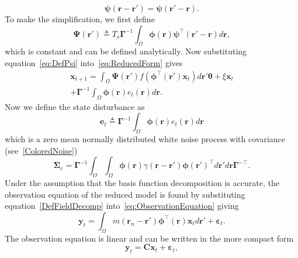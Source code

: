 \documentclass[10pt,a4paper]{article}
\begin{document}
\begin{equation}
	\boldsymbol{\psi} (\mathbf{r}-\mathbf{r}') = \boldsymbol{\psi} (\mathbf{r}'-\mathbf{r}).
\end{equation}
To make the simplification, we first define
\begin{equation}\label{eq:DefPsi}
	\boldsymbol{\Psi}(\mathbf{r}') \triangleq T_s\boldsymbol{\Gamma}^{-1}\int_\Omega {\boldsymbol{\phi}(\mathbf{r})\boldsymbol{\psi}^{\top} (\mathbf{r}'-\mathbf{r})d\mathbf{r}},
\end{equation}
which is constant and can be defined analytically. Now substituting equation~\ref{eq:DefPsi} into~\ref{eq:ReducedForm} gives
\begin{eqnarray}
	\mathbf{x}_{t+1} = \int_\Omega \boldsymbol{\Psi}(\mathbf{r}') f(\boldsymbol{\phi}^{\top}(\mathbf{r}')\mathbf{x}_t) d\mathbf{r}' \boldsymbol{\theta} + \xi\mathbf{x}_t\nonumber \\
+ \boldsymbol{\Gamma}^{-1} \int_\Omega{\boldsymbol{\phi}(\mathbf{r})e_t(\mathbf{r})d\mathbf{r}}.
\end{eqnarray}
Now we define the state disturbance as
\begin{equation}\label{eq:AppendixWt} 
	\mathbf{e}_t \triangleq \boldsymbol{\Gamma}^{-1}\int_\Omega {\boldsymbol{\phi} ( \mathbf{r} )e_t( \mathbf{r} )d\mathbf{r}} 
\end{equation}
which is a zero mean normally distributed white noise process with covariance (see~\ref{ColoredNoise})
\begin{equation}
	\boldsymbol\Sigma_e =\mathbf{\Gamma}^{-1}\int_{\Omega}\int_{\Omega}\boldsymbol{\phi}\left(\mathbf r\right) \gamma\left(\mathbf r- \mathbf r' \right)\boldsymbol{\phi}\left(\mathbf r'\right)^{\top}d\mathbf r' d\mathbf r\mathbf{\Gamma}^{- \top}. 
\end{equation}
Under the assumption that the basis function decomposition is accurate, the observation equation of the reduced model is found by substituting equation~\ref{DefFieldDecomp} into~\ref{eq:ObservationEquation} giving
\begin{equation}\label{eq:ReducedObservationEquation}
	\mathbf{y}_t = \int_{\Omega}{m\left(\mathbf{r}_n-\mathbf{r}'\right)\boldsymbol{\phi}^{\top}\left(\mathbf{r}\right) \mathbf{x}_td\mathbf{r}'} + \boldsymbol{\varepsilon}_t. 
\end{equation}
The observation equation is linear and can be written in the more compact form
\begin{equation}\label{ObservationEquation} 
	\mathbf{y}_t = \mathbf{C}\mathbf{x}_t + \boldsymbol{\varepsilon}_t,
\end{equation}
\end{document}
